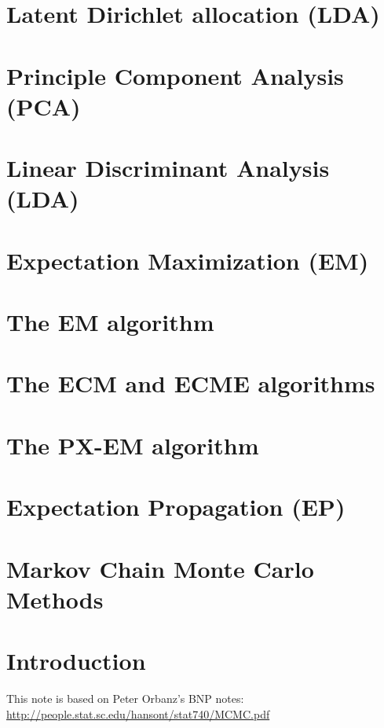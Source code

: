 

\section{Latent Dirichlet allocation (LDA)}
\section{Principle Component Analysis (PCA)}
\section{Linear Discriminant Analysis (LDA)}

\section{Expectation Maximization (EM)}
\section{The EM algorithm}
\section{The ECM and ECME algorithms}
\section{The PX-EM algorithm}

\section{Expectation Propagation (EP)}


\section{Markov Chain Monte Carlo Methods}
\section{Introduction}
This note is based on Peter Orbanz's BNP notes:
\vspace*{5mm}
\\
\url{http://people.stat.sc.edu/hansont/stat740/MCMC.pdf}

